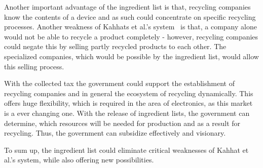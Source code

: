 Another important advantage of the ingredient list is that, recycling companies know the 
contents of a device and as such could concentrate on specific recycling processes. 
Another weakness of Kahhats et al.'s system~\cite{kahhat2008exploring} is that, a company alone would not 
be able to recycle a product completely - however, recycling companies could negate this 
by selling partly recycled products to each other. The specialized companies, which would 
be possible by the ingredient list, would allow this selling process.

With the collected tax the government could support the establishment of recycling companies 
and in general the ecosystem of recycling dynamically. This offers huge flexibility, which 
is required in the area of electronics, as this market is a ever changing one. With the 
release of ingredient lists, the government can determine, which resources will be needed 
for production and  as a result for recycling. Thus, the government can subsidize effectively and visionary.

To sum up, the ingredient list could eliminate critical weaknesses of Kahhat et al.'s system, 
while also offering new possibilities.


\label{applications}